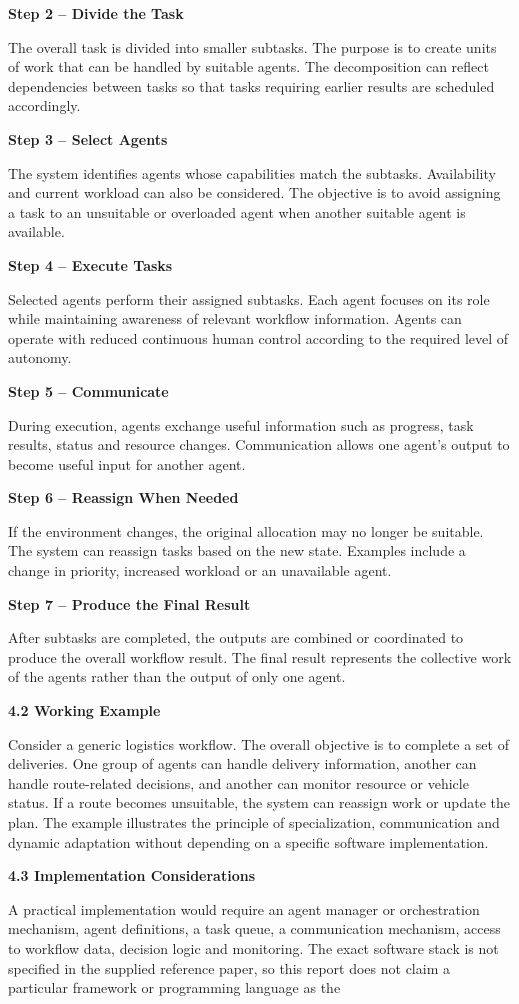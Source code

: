 \documentclass[12pt,letterpaper]{article}
\newcommand{\sectiontitle}[1]{%
  \vspace{6pt}%
  {\noindent\fontsize{13.2pt}{16pt}\selectfont\bfseries #1\par}%
  \vspace{2pt}%
}
\newcommand{\steptitle}[1]{%
  \vspace{4pt}%
  {\noindent\fontsize{11.3pt}{14pt}\selectfont\bfseries #1\par}%
  \vspace{1pt}%
}
\begin{document}
\steptitle{Step 2 – Divide the Task}
The overall task is divided into smaller subtasks. The purpose is to create units of work that can be handled by suitable agents. The decomposition can reflect dependencies between tasks so that tasks requiring earlier results are scheduled accordingly.

\steptitle{Step 3 – Select Agents}
The system identifies agents whose capabilities match the subtasks. Availability and current workload can also be considered. The objective is to avoid assigning a task to an unsuitable or overloaded agent when another suitable agent is available.

\steptitle{Step 4 – Execute Tasks}
Selected agents perform their assigned subtasks. Each agent focuses on its role while maintaining awareness of relevant workflow information. Agents can operate with reduced continuous human control according to the required level of autonomy.
\newpage

\steptitle{Step 5 – Communicate}
During execution, agents exchange useful information such as progress, task results, status and resource changes. Communication allows one agent's output to become useful input for another agent.

\steptitle{Step 6 – Reassign When Needed}
If the environment changes, the original allocation may no longer be suitable. The system can reassign tasks based on the new state. Examples include a change in priority, increased workload or an unavailable agent.

\steptitle{Step 7 – Produce the Final Result}
After subtasks are completed, the outputs are combined or coordinated to produce the overall workflow result. The final result represents the collective work of the agents rather than the output of only one agent.

\sectiontitle{4.2 Working Example}
Consider a generic logistics workflow. The overall objective is to complete a set of deliveries. One group of agents can handle delivery information, another can handle route-related decisions, and another can monitor resource or vehicle status. If a route becomes unsuitable, the system can reassign work or update the plan. The example illustrates the principle of specialization, communication and dynamic adaptation without depending on a specific software implementation.

\sectiontitle{4.3 Implementation Considerations}
A practical implementation would require an agent manager or orchestration mechanism, agent definitions, a task queue, a communication mechanism, access to workflow data, decision logic and monitoring. The exact software stack is not specified in the supplied reference paper, so this report does not claim a particular framework or programming language as the
\newpage
\end{document}
